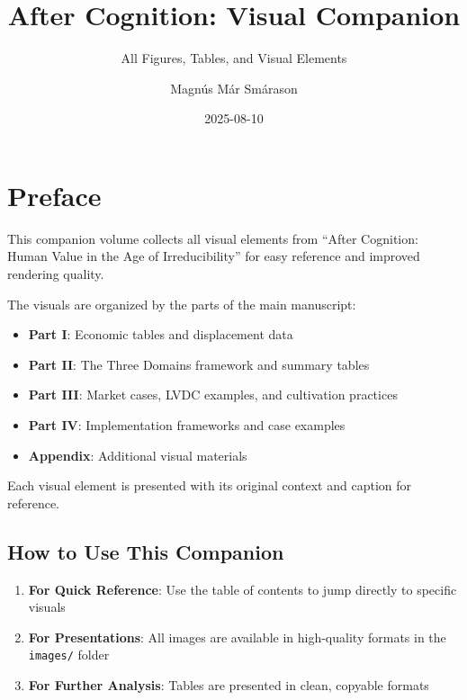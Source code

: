 \documentclass[
  a4paper,
]{report}
\title{After Cognition: Visual Companion}
\subtitle{All Figures, Tables, and Visual Elements}
\author{Magnús Már Smárason}
\date{2025-08-10}
\providecommand{\tightlist}{%
  \setlength{\itemsep}{0pt}\setlength{\parskip}{0pt}}
\renewcommand*\contentsname{Table of contents}
\newcommand\contentsname{Table of contents}
\begin{document}
\maketitle

\renewcommand*\contentsname{Table of contents}
{
\hypersetup{linkcolor=}
\setcounter{tocdepth}{2}
\tableofcontents
}


\chapter*{Preface}\label{preface}


This companion volume collects all visual elements from ``After
Cognition: Human Value in the Age of Irreducibility'' for easy reference
and improved rendering quality.

The visuals are organized by the parts of the main manuscript:

\begin{itemize}
\tightlist
\item
  \textbf{Part I}: Economic tables and displacement data
\item
  \textbf{Part II}: The Three Domains framework and summary tables\\
\item
  \textbf{Part III}: Market cases, LVDC examples, and cultivation
  practices
\item
  \textbf{Part IV}: Implementation frameworks and case examples
\item
  \textbf{Appendix}: Additional visual materials
\end{itemize}

Each visual element is presented with its original context and caption
for reference.

\section*{How to Use This Companion}\label{how-to-use-this-companion}


\begin{enumerate}
\def\labelenumi{\arabic{enumi}.}
\tightlist
\item
  \textbf{For Quick Reference}: Use the table of contents to jump
  directly to specific visuals
\item
  \textbf{For Presentations}: All images are available in high-quality
  formats in the \texttt{images/} folder
\item
  \textbf{For Further Analysis}: Tables are presented in clean, copyable
  formats
\end{enumerate}
\end{document}

